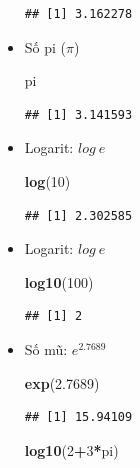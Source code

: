 \documentclass[
]{book}
\newenvironment{Shaded}{\begin{snugshade}}{\end{snugshade}}
\newcommand{\DecValTok}[1]{\textcolor[rgb]{0.00,0.00,0.81}{#1}}
\newcommand{\FloatTok}[1]{\textcolor[rgb]{0.00,0.00,0.81}{#1}}
\newcommand{\KeywordTok}[1]{\textcolor[rgb]{0.13,0.29,0.53}{\textbf{#1}}}
\newcommand{\NormalTok}[1]{#1}
\newcommand{\OperatorTok}[1]{\textcolor[rgb]{0.81,0.36,0.00}{\textbf{#1}}}
\begin{document}
\begin{itemize}
\begin{verbatim}
## [1] 3.162278
\end{verbatim}
\item
  Số pi (\(\pi\))

\begin{Shaded}
\begin{Highlighting}[]
\NormalTok{pi}
\end{Highlighting}
\end{Shaded}

\begin{verbatim}
## [1] 3.141593
\end{verbatim}
\item
  Logarit: \(log~e~\)

\begin{Shaded}
\begin{Highlighting}[]
\KeywordTok{log}\NormalTok{(}\DecValTok{10}\NormalTok{)}
\end{Highlighting}
\end{Shaded}

\begin{verbatim}
## [1] 2.302585
\end{verbatim}
\item
  Logarit: \(log~e~\)

\begin{Shaded}
\begin{Highlighting}[]
\KeywordTok{log10}\NormalTok{(}\DecValTok{100}\NormalTok{)}
\end{Highlighting}
\end{Shaded}

\begin{verbatim}
## [1] 2
\end{verbatim}
\item
  Số mũ: \(e^2.7689\)

\begin{Shaded}
\begin{Highlighting}[]
\KeywordTok{exp}\NormalTok{(}\FloatTok{2.7689}\NormalTok{)}
\end{Highlighting}
\end{Shaded}

\begin{verbatim}
## [1] 15.94109
\end{verbatim}

\begin{Shaded}
\begin{Highlighting}[]
\KeywordTok{log10}\NormalTok{(}\DecValTok{2}\OperatorTok{+}\DecValTok{3}\OperatorTok{*}\NormalTok{pi)}
\end{Highlighting}
\end{Shaded}


\end{itemize}
\end{document}
